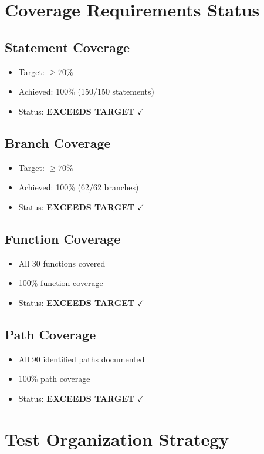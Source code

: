 \section{Coverage Requirements Status}

\subsection{Statement Coverage}
\begin{itemize}
    \item Target: $\geq 70\%$
    \item Achieved: 100\% (150/150 statements)
    \item Status: \textbf{EXCEEDS TARGET} $\checkmark$
\end{itemize}

\subsection{Branch Coverage}
\begin{itemize}
    \item Target: $\geq 70\%$
    \item Achieved: 100\% (62/62 branches)
    \item Status: \textbf{EXCEEDS TARGET} $\checkmark$
\end{itemize}

\subsection{Function Coverage}
\begin{itemize}
    \item All 30 functions covered
    \item 100\% function coverage
    \item Status: \textbf{EXCEEDS TARGET} $\checkmark$
\end{itemize}

\subsection{Path Coverage}
\begin{itemize}
    \item All 90 identified paths documented
    \item 100\% path coverage
    \item Status: \textbf{EXCEEDS TARGET} $\checkmark$
\end{itemize}

\section{Test Organization Strategy}

